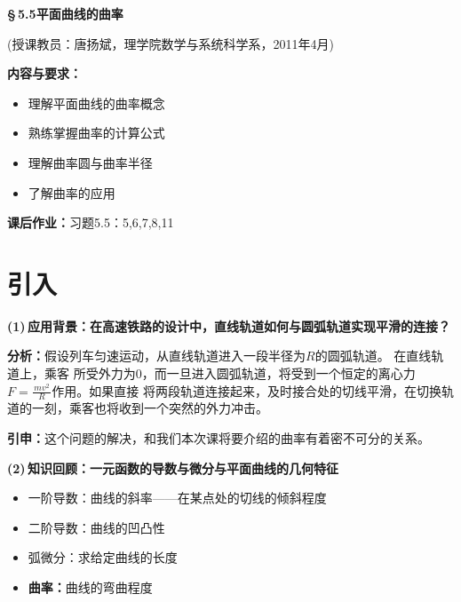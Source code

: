 \documentclass[a4paper]{article}
\newcommand*{\df}[2]{\displaystyle\frac{\,{#1}\,}{\,{#2}\,}}
\begin{document}

%    


\begin{center}
	{\Huge\bf \S\,5.5\;平面曲线的曲率}
	
	(授课教员：唐扬斌，理学院数学与系统科学系，2011年4月)
\end{center}
\vspace{2em}
{\Large\bf 内容与要求：}
\begin{itemize}
  \item 理解平面曲线的曲率概念
  \item 熟练掌握曲率的计算公式
  \item 理解曲率圆与曲率半径
  \item 了解曲率的应用
\end{itemize}

{\Large\bf 课后作业：}习题5.5：5,6,7,8,11

\setcounter{section}{-1}
\section{引入}

{\bf (1)\,应用背景：在高速铁路的设计中，直线轨道如何与圆弧轨道实现平滑的连接？}

{\bf 分析：}假设列车匀速运动，从直线轨道进入一段半径为$R$的圆弧轨道。
在直线轨道上，乘客 所受外力为$0$，而一旦进入圆弧轨道，将受到一个恒定的离心力$F=\df{mv^2}R$作用。如果直接
将两段轨道连接起来，及时接合处的切线平滑，在切换轨道的一刻，乘客也将收到一个突然的外力冲击。

{\bf 引申：}这个问题的解决，和我们本次课将要介绍的曲率有着密不可分的关系。
\bigskip

{\bf (2)\,知识回顾：一元函数的导数与微分与平面曲线的几何特征}
\begin{itemize}
  \item {一阶导数：}曲线的斜率——在某点处的切线的倾斜程度
  \item {二阶导数：}曲线的凹凸性
  \item {弧微分：}求给定曲线的长度
  \item {\bf 曲率：}曲线的弯曲程度
\end{itemize}
\end{document}
